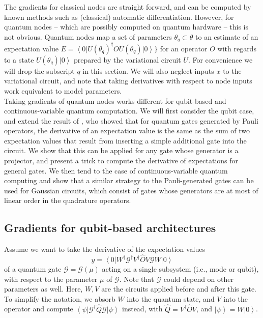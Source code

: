 \documentclass[aps,pra,10pt,twocolumn,groupedaddress,nofootinbib]{revtex4-1}
\theoremstyle{plain}
\newcommand{\ket}[1]{\ensuremath{\left| #1 \right \rangle}}
\newcommand{\bra}[1]{\ensuremath{\left \langle #1 \right |}}
\newcommand{\G}{\mathcal{G}}
\begin{document}
The gradients for classical nodes are straight forward, and can be computed by known methods such as (classical) automatic differentiation. However, for quantum nodes -- which are possibly computed on quantum hardware -- this is not obvious. Quantum nodes map a set of parameters  $\theta_q \subset \theta$ to an estimate of an expectation value $E = \bra{0} U(\theta_q)^{\dagger} O U(\theta_q) \ket{0} \}$ for an operator $O$ with regards to a state $U(\theta_q) \ket{0}$ prepared by the variational circuit $U$. For convenience we will drop the subscript $q$ in this section. We will also neglect inputs $x$ to the variational circuit, and note that taking derivatives with respect to node inputs work equivalent to model parameters.\\

Taking gradients of quantum nodes works different for qubit-based and continuous-variable quantum computation. We will first consider the qubit case, and extend the result of \cite{mitarai}, who showed that for quantum gates generated by Pauli operators, the derivative of an expectation value is the same as the sum of two expectation values that result from inserting a simple additional gate into the circuit. We show that this can be applied for any gate whose generator is a projector, and present a trick to compute the derivative of expectations for general gates. We then tend to the case of continuous-variable quantum computing and show that a similar strategy to the Pauli-generated gates can be used for Gaussian circuits, which consist of gates whose generators are at most of linear order in the quadrature operators. 


\subsection{Gradients for qubit-based architectures}

Assume we want to take the derivative of the expectation values
\[ y = \bra{0}W^{\dagger} \G^{\dagger}  V^{\dagger} \hat{O} V \G W \ket{0}\]
of a quantum gate $\G = \G(\mu)$ acting on a single subsystem (i.e., mode or qubit), with respect to the parameter $\mu$ of $\G$. Note that $\G$ could depend on other parameters as well. Here, $W,V$ are the circuits applied before and after this gate. To simplify the notation, we absorb $W$ into the quantum state, and $V$ into the operator and compute $ \bra{\psi} \G^{\dagger}  \hat{Q} \G \ket{\psi}$ instead, with $\hat{Q} = V^{\dagger} \hat{O} V$, and $\ket{\psi}= W \ket{0}$.\\
\end{document}
